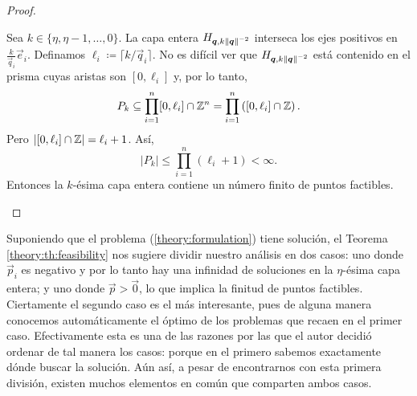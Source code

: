 \begin{proof}
\begin{enumerate}
			Sea $k \in \lbrace \eta, \eta - 1, \ldots, 0 \rbrace$. La capa entera $H_{\boldsymbol{q},
			k\left\lVert \boldsymbol{q} \right\rVert^{-2}}$ interseca los ejes positivos en $\frac{k}{\vec{q}_i}\vec{e}_i$.
			Definamos $\ell_i \coloneq \lceil k/\vec{q}_i \rceil$. No es difícil ver que
			$H_{\boldsymbol{q}, k\left\lVert \boldsymbol{q} \right\rVert^{-2}}$ está contenido en el prisma cuyas aristas son $[0,
			\ell_i]$ y, por lo tanto,
			\begin{equation*}
				P_k \subseteq \prod_{i = 1}^{n} [0, \ell_i] \cap \mathbb{Z}^n = \prod_{i = 1}^{n}
				\left( [0, \ell_i] \cap \mathbb{Z} \right).
			\end{equation*}
			Pero $\left| [0, \ell_i] \cap \mathbb{Z} \right| = \ell_i + 1$. Así,
			\begin{equation*}
				|P_k| \leq \prod_{i = 1}^{n} (\ell_i + 1) < \infty.
			\end{equation*}
			Entonces la $k$-ésima capa entera contiene un número finito de puntos factibles.
	\end{enumerate}
\end{proof}

Suponiendo que el problema (\ref{theory:formulation}) tiene solución, el Teorema
\ref{theory:th:feasibility} nos sugiere dividir nuestro análisis en dos casos: uno donde $\vec{p}_i$
es negativo y por lo tanto hay una infinidad de soluciones en la $\eta$-ésima capa entera; y uno
donde $\vec{p} > \vec{0}$, lo que implica la finitud de puntos factibles. Ciertamente el segundo
caso es el más interesante, pues de alguna manera conocemos automáticamente el óptimo de los
problemas que recaen en el primer caso. Efectivamente esta es una de las razones por las que el
autor decidió ordenar de tal manera los casos: porque en el primero sabemos exactamente dónde buscar
la solución. Aún así, a pesar de encontrarnos con esta primera división, existen muchos elementos en
común que comparten ambos casos.

